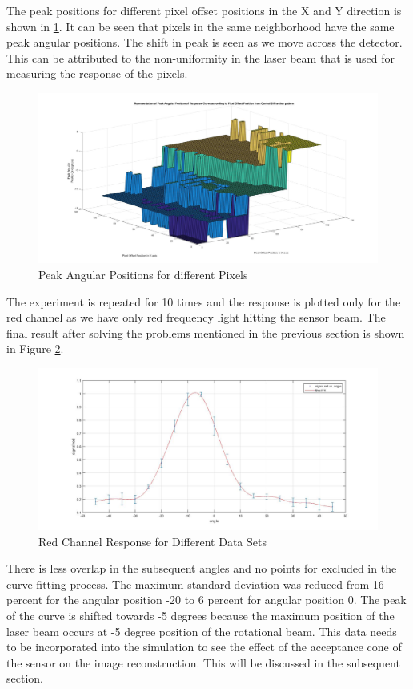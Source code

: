 The peak positions for different pixel offset positions in the X and Y direction is shown in \ref{fig:peak_pixel_pos}. It can be seen that pixels in the same neighborhood have the same peak angular positions. The shift in peak is seen as we move across the detector. This can be attributed to the non-uniformity in the laser beam that is used for measuring the response of the pixels.
\begin{figure}[!h]
\centering
\includegraphics[scale=0.225]{pics/MeshPlotAngularPeak.jpg}
\caption{Peak Angular Positions for different Pixels}
\label{fig:peak_pixel_pos}
\end{figure}

The experiment is repeated for 10 times and the response is plotted only for the red channel as we have only red frequency light hitting the sensor beam. The final result after solving the problems mentioned in the previous section is shown in Figure \ref{fig:acceptance_final}.
\begin{figure}[!h]
\centering
\includegraphics[scale=0.2125]{pics/FinalCRAExp.jpg}
\caption{Red Channel Response for Different Data Sets}
\label{fig:acceptance_final}
\end{figure}
There is less overlap in the subsequent angles and no points for excluded in the curve fitting process. The maximum standard deviation was reduced from 16 percent for the angular position -20 to 6 percent for angular position 0. The peak of the curve is shifted towards -5 degrees because the maximum position of the laser beam occurs at -5 degree position of the rotational beam. This data needs to be incorporated into the simulation to see the effect of the acceptance cone of the sensor on the image reconstruction. This will be discussed in the subsequent section.
